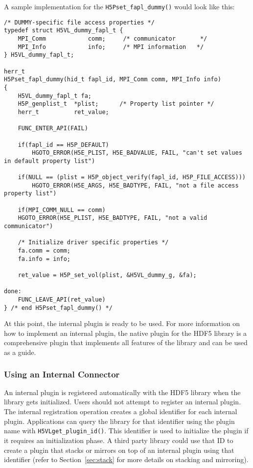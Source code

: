 A sample implementation for the {\tt H5Pset\_fapl\_dummy()} would look like this:

\begin{lstlisting}
/* DUMMY-specific file access properties */
typedef struct H5VL_dummy_fapl_t {
    MPI_Comm            comm;     /* communicator       */
    MPI_Info            info;     /* MPI information   */
} H5VL_dummy_fapl_t;

herr_t
H5Pset_fapl_dummy(hid_t fapl_id, MPI_Comm comm, MPI_Info info)
{
    H5VL_dummy_fapl_t fa;
    H5P_genplist_t  *plist;      /* Property list pointer */
    herr_t          ret_value;

    FUNC_ENTER_API(FAIL)

    if(fapl_id == H5P_DEFAULT)
        HGOTO_ERROR(H5E_PLIST, H5E_BADVALUE, FAIL, "can't set values in default property list")

    if(NULL == (plist = H5P_object_verify(fapl_id, H5P_FILE_ACCESS)))
        HGOTO_ERROR(H5E_ARGS, H5E_BADTYPE, FAIL, "not a file access property list")

    if(MPI_COMM_NULL == comm)
	HGOTO_ERROR(H5E_PLIST, H5E_BADTYPE, FAIL, "not a valid communicator")

    /* Initialize driver specific properties */
    fa.comm = comm;
    fa.info = info;

    ret_value = H5P_set_vol(plist, &H5VL_dummy_g, &fa);

done:
    FUNC_LEAVE_API(ret_value)
} /* end H5Pset_fapl_dummy() */
\end{lstlisting}

At this point, the internal plugin is ready to be used. For more
information on how to implement an internal plugin, the native plugin
for the HDF5 library is a comprehensive plugin that implements all
features of the library and can be used as a guide.

\subsubsection{Using an Internal Connector}
An internal plugin is registered automatically with the HDF5 library when the library gets initialized. Users should not attempt to register an internal plugin. The internal registration operation creates a global identifier for each internal plugin. Applications can query the library for that identifier using the plugin name with {\tt H5VLget\_plugin\_id()}. This identifier is used to initialize the plugin if it requires an initialization phase. A third party library could use that ID to create a plugin that stacks or mirrors on top of an internal plugin using that identifier (refer to Section~\ref{sec:stack} for more details on stacking and mirroring).

